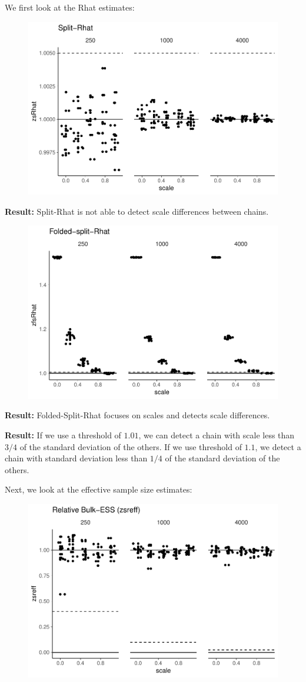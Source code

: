 \documentclass[american,]{article}
\begin{document}
We first look at the Rhat estimates:

\begin{figure}[t]
  \centering
  \includegraphics[width=0.6\linewidth]{graphics/zsrhat-scaled-chain-1.pdf}
\end{figure}

\textbf{Result:} Split-Rhat is not able to detect scale differences
between chains.

\begin{figure}[t]
  \centering
  \includegraphics[width=0.6\linewidth]{graphics/zfsrhat-scaled-chain-1.pdf}
\end{figure}

\textbf{Result:} Folded-Split-Rhat focuses on scales and detects scale
differences.

\textbf{Result:} If we use a threshold of \(1.01\), we can detect a
chain with scale less than \(3/4\) of the standard deviation of the
others. If we use threshold of \(1.1\), we detect a chain with standard
deviation less than \(1/4\) of the standard deviation of the others.

Next, we look at the effective sample size estimates:

\begin{figure}[t]
  \centering
  \includegraphics[width=0.6\linewidth]{graphics/zsreff-scaled-chain-1.pdf}
\end{figure}
\end{document}
